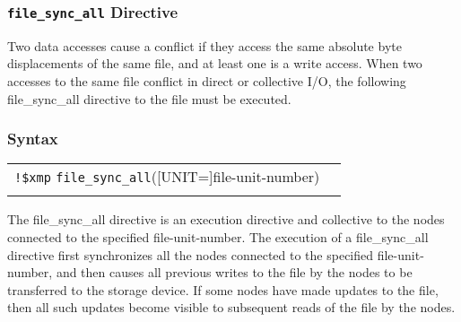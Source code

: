    \subsubsection{{\tt file\_sync\_all} Directive}
   Two data accesses cause a conflict if they access the same absolute byte
   displacements of the same file, and at least one is a write access. 
   When two accesses to the same file conflict in direct or collective I/O,
   the following file\_sync\_all directive to the file must be executed.

   \subsubsection*{Syntax}

   \begin{tabular}{ll}
     \verb|!$xmp| {\tt file\_sync\_all}([UNIT=]file-unit-number) \\
      \\
   \end{tabular}

   The file\_sync\_all directive is an execution directive and
   collective to the nodes connected to the specified
   file-unit-number.
   The execution of a file\_sync\_all directive first synchronizes all
   the nodes connected to the specified file-unit-number, and then causes
   all previous writes to the file by the nodes to be transferred to
   the storage device.
   If some nodes have made updates to the file, then all such updates
   become visible to subsequent reads of the file by the nodes.




